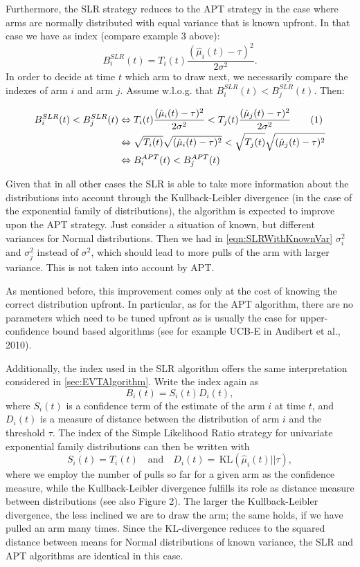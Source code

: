 \documentclass[11pt,]{article}
\newcommand{\KL}{\,\text{KL}}
\newcommand*{\Alignyesnumber}{\refstepcounter{equation}\tag{\theequation}}%
\begin{document}
Furthermore, the SLR strategy reduces to the APT strategy in the case
where arms are normally distributed with equal variance that is known
upfront. In that case we have as index (compare example 3 above): \[
B_i^{SLR}(t) = T_i(t)\frac{(\hat{\mu}_i(t) - \tau)^2}{2\sigma^2}.
\] In order to decide at time \(t\) which arm to draw next, we
necessarily compare the indexes of arm \(i\) and arm \(j\). Assume
w.l.o.g. that \(B_i^{SLR}(t) < B_j^{SLR}(t)\). Then:

\begin{align*}
B_i^{SLR}(t) < B_j^{SLR}(t) & \Leftrightarrow 
T_i(t)\frac{(\hat{\mu}_i(t) - \tau)^2}{2\sigma^2} < T_j(t)\frac{(\hat{\mu}_j(t) - \tau)^2}{2\sigma^2} \Alignyesnumber\label{eqn:SLRWithKnownVar}\\
& \Leftrightarrow 
\sqrt{T_i(t)}\sqrt{(\hat{\mu}_i(t) - \tau)^2} < \sqrt{T_j(t)}\sqrt{(\hat{\mu}_j(t) - \tau)^2} \\
& \Leftrightarrow 
B_i^{APT}(t) < B_j^{APT}(t)
\end{align*}

Given that in all other cases the SLR is able to take more information
about the distributions into account through the Kullback-Leibler
divergence (in the case of the exponential family of distributions), the
algorithm is expected to improve upon the APT strategy. Just consider a
situation of known, but different variances for Normal distributions.
Then we had in \autoref{eqn:SLRWithKnownVar} \(\sigma_i^2\) and
\(\sigma_j^2\) instead of \(\sigma^2\), which should lead to more pulls
of the arm with larger variance. This is not taken into account by APT.

As mentioned before, this improvement comes only at the cost of knowing
the correct distribution upfront. In particular, as for the APT
algorithm, there are no parameters which need to be tuned upfront as is
usually the case for upper-confidence bound based algorithms (see for
example UCB-E in Audibert et al., 2010).

Additionally, the index used in the SLR algorithm offers the same
interpretation considered in \autoref{sec:EVTAlgorithm}. Write the index
again as \[
B_i(t) = S_i(t) D_i(t),
\] where \(S_i(t)\) is a confidence term of the estimate of the arm
\(i\) at time \(t\), and \(D_i(t)\) is a measure of distance between the
distribution of arm \(i\) and the threshold \(\tau\). The index of the
Simple Likelihood Ratio strategy for univariate exponential family
distributions can then be written with \[
S_i(t) = T_i(t) \quad \text{and} \quad
D_i(t) = \KL(\hat{\mu}_i(t)||\tau),
\] where we employ the number of pulls so far for a given arm as the
confidence measure, while the Kullback-Leibler divergence fulfills its
role as distance measure between distributions (see also Figure 2). The
larger the Kullback-Leibler divergence, the less inclined we are to draw
the arm; the same holds, if we have pulled an arm many times. Since the
KL-divergence reduces to the squared distance between means for Normal
distributions of known variance, the SLR and APT algorithms are
identical in this case.
\end{document}
